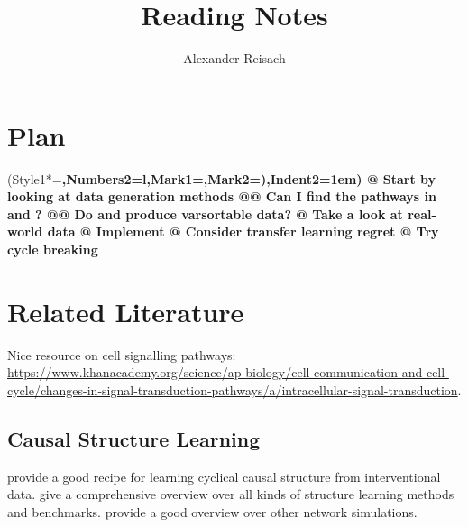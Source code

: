 \documentclass{article}
\title{Reading Notes}
\author{Alexander Reisach}
\begin{document}
    
\maketitle

\section{Plan}
\begin{easylist}
    \ListProperties(Style1*=\bfseries,Numbers2=l,Mark1={},Mark2={)},Indent2=1em)
    @ Start by looking at data generation methods
    @@ Can I find the \cite{sachs2005causal} pathways in \cite{belinky2015pathcards} and \cite{perfetto2016signor}?
    @@ Do \cite{van2006syntren} and \cite{schaffter2011genenetweaver} produce varsortable data?
    @ Take a look at real-world data
    @ Implement \cite{brouillard2020differentiable}
    @ Consider transfer learning regret
    @ Try cycle breaking
\end{easylist}

\section{Related Literature}
Nice resource on cell signalling pathways: \url{https://www.khanacademy.org/science/ap-biology/cell-communication-and-cell-cycle/changes-in-signal-transduction-pathways/a/intracellular-signal-transduction}.

\subsection{Causal Structure Learning}
\cite{itani2010structure} provide a good recipe for learning cyclical causal structure from interventional data.
\cite{vowels2021} give a comprehensive overview over all kinds of structure learning methods and benchmarks.
\cite{van2006syntren} provide a good overview over other network simulations.
\end{document}
